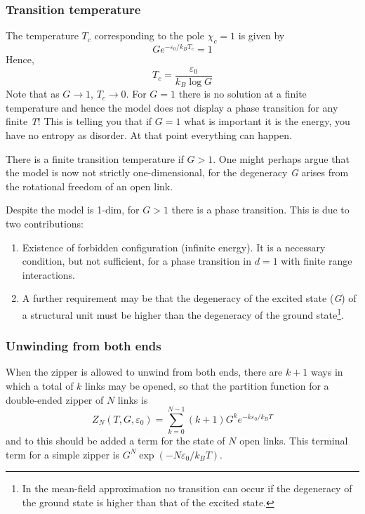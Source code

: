 \documentclass[../../Main/Main.tex]{subfiles}
\begin{document}
\subsubsection{Transition temperature}
The temperature \( T_c \) corresponding to the pole \( \chi_c =1 \) is given by 
  \begin{equation*}
    G e^{-\varepsilon _0 /k_B T_c}  = 1
  \end{equation*}
Hence,
\begin{equation}
  T_c = \frac{\varepsilon _0}{k_B \log{G} }
  \label{eq:9_3}
\end{equation}
Note that as \( G \rightarrow 1 \), \( T_c \rightarrow 0 \). For \( G=1 \) there is no solution at a finite temperature and hence the model does not display a phase transition for any finite \emph{T}! This is telling you that if \( G=1 \) what is important it is the energy, you have no entropy as disorder. At that point everything can happen.

There is a finite transition temperature if \(G>1\). One might perhaps argue that the model is now not strictly one-dimensional, for the degeneracy \emph{G} arises from the rotational freedom of an open link.
\begin{remark}
Despite the model is 1-dim, for \( G>1 \) there is a phase transition. This is due to two contributions:
\begin{enumerate}
\item Existence of forbidden configuration (infinite energy). It is a necessary condition, but not sufficient, for a phase transition in \( d=1 \) with finite range interactions.
\item A further requirement may be that the degeneracy of the excited state (\emph{G}) of a structural unit must be higher than the degeneracy of the ground state\footnote{In the mean-field approximation no transition can occur if the degeneracy of the ground state is higher than that of the excited state.}.
\end{enumerate}
\end{remark}
\subsubsection{Unwinding from both ends}
When the zipper is allowed to unwind from both ends, there are \(k+1\) ways in which a total of \(k\) links may be opened, so that the partition function for a double-ended zipper of \(N\) links is
\begin{equation}
  Z_N (T,G, \varepsilon _0) = \sum_{k=0}^{N-1}  (k+1) G^k e^{-k \varepsilon _0/k_B T} 
\end{equation}
and to this should be added a term for the state of \(N\) open links. This terminal term for a simple zipper is \( G^N \exp(-N \varepsilon_0/ k_B T) \).
\end{document}
